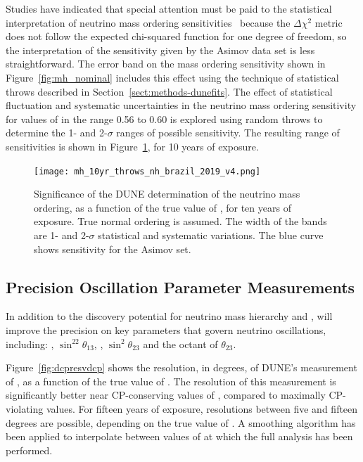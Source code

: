Studies have indicated that special attention must be paid to the statistical interpretation of neutrino mass ordering sensitivities~\cite{Qian:2012zn,Blennow:2013oma} because the $\Delta\chi^2$ metric does not follow the expected chi-squared function for one degree of freedom, so the interpretation of the sensitivity given by the Asimov data set is less straightforward. The error band on the mass ordering sensitivity shown in Figure~\ref{fig:mh_nominal} includes this effect using the technique of statistical throws described in Section~\ref{sect:methods-dunefits}. The effect of statistical fluctuation and systematic uncertainties in the neutrino mass ordering sensitivity for values of  in the range 0.56 to 0.60 is explored using random throws to determine the 1- and 2-$\sigma$ ranges of possible sensitivity. The resulting range of sensitivities is shown in Figure~\ref{fig:mh_stats}, for 10 years of exposure.

\begin{figure}[h!]
    \centering
		\texttt{[image: mh\_10yr\_throws\_nh\_brazil\_2019\_v4.png]}
	\caption[Significance of the DUNE determination of the neutrino mass ordering: statistical and systematic variations]{Significance of the DUNE determination of the neutrino mass ordering, as a function of the true value of \deltacp, for ten years of exposure. True normal ordering is assumed. The width of the bands are 1- and 2-$\sigma$ statistical and systematic variations. The blue curve shows sensitivity for the Asimov set.}
    \label{fig:mh_stats}
\end{figure}

\subsection{Precision Oscillation Parameter Measurements}
\label{sec:physics-lbnosc-prec}

In addition to the discovery potential for neutrino mass hierarchy and , 
 will improve the precision on key parameters that govern neutrino oscillations, including: \deltacp, $\sin^22\theta_{13}$, , $\sin^2\theta_{23}$ and the octant of $\theta_{23}$. 

Figure~\ref{fig:dcpresvdcp} shows the resolution, in degrees, of DUNE's measurement of \deltacp, as a function of the true value of \deltacp. The resolution of this measurement is significantly better near CP-conserving values of \deltacp, compared to maximally CP-violating values. For fifteen years of exposure, resolutions between five and fifteen degrees are possible, depending on the true value of \deltacp. A smoothing algorithm has been applied to interpolate between values of \deltacp at which the full analysis has been performed.

